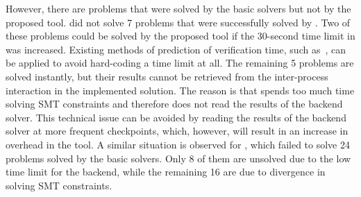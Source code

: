 However, there are problems that were solved by the basic solvers but not by the proposed tool. \ringenCICI{\cvc{}} did not solve 7 problems that were successfully solved by \ringen{\cvc{}}. Two of these problems could be solved by the proposed tool if the 30-second time limit in \theringenCICI{} was increased. Existing methods of prediction of verification time, such as~\cite{10.1145/3121257.3121262}, can be applied to avoid hard-coding a time limit at all. The remaining 5 problems are solved instantly, but their results cannot be retrieved from the inter-process interaction in the implemented solution. The reason is that \racer{} spends too much time solving SMT constraints and therefore does not read the results of the backend solver. This technical issue can be avoided by reading the results of the backend solver at more frequent checkpoints, which, however, will result in an increase in overhead in the tool. A similar situation is observed for \ringenCICI{\vampire{}}, which failed to solve 24 problems solved by the basic solvers. Only 8 of them are unsolved due to the low time limit for the backend, while the remaining 16 are due to \racer{} divergence in solving SMT constraints.

